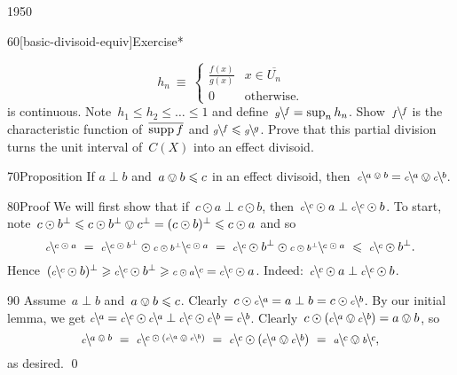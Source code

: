 \begin{parsec}{1950}
\begin{point}{60}[basic-divisoid-equiv]{Exercise*}
\begin{enumerate}
\begin{equation*}
    h_n \ \equiv \  \begin{cases}
        \frac{f(x)}{g(x)} & x \in \overline{U_n}\\
        0 & \text{otherwise}.
    \end{cases}
\end{equation*}
is continuous.
Note~$h_1 \leq h_2 \leq \ldots \leq 1$
    and define~$\rfrac{f}{g} = \sup_n h_n$.
Show~$\rfrac{f}{f}$ is the characteristic function
    of~$\overline{\supp f}$ and
    $\rfrac{f}{g} \leq \rfrac{g}{g}$.
Prove that this partial division turns the unit interval of~$C(X)$
    into an effect divisoid.
\end{enumerate}

\end{point}
\begin{point}{70}{Proposition}%
If $a \perp b$ and~$a \ovee b \leq c$ in an effect divisoid,
then~$\rfrac{a \ovee b}{c } = \rfrac{a}{c} \ovee \rfrac{b}{c}$.
\begin{point}{80}{Proof}%
We will first show that if~$c \odot a \perp c \odot b$,
    then~$\rfrac{c}{c} \odot a \perp \rfrac{c}{c}\odot b$.
To start,
    note~$c \odot b^\perp \leq c \odot b^\perp \ovee c^\perp
        = (c \odot b)^\perp \leq c \odot a$
        and so
\begin{equation*}
     \rfrac{c \odot a}{c} 
     \ = \ 
            \rfrac{c \odot b^\perp}{c} \odot
            \rfrac{c \odot a}{c \odot b^\perp}
     \ = \ 
            \rfrac{c}{c} \odot b^\perp \odot
            \rfrac{c \odot a}{c \odot b^\perp}
    \ \leq \ \rfrac{c}{c} \odot b^\perp.
\end{equation*}
Hence~$(\rfrac{c}{c}\odot b)^\perp
            \geq \rfrac{c}{c} \odot b^\perp
            \geq \rfrac{c}{c \odot a}
            = \rfrac{c}{c} \odot a $.
    Indeed:~$\rfrac{c}{c}\odot a \perp \rfrac{c}{c} \odot b$.
\begin{point}{90}%
Assume~$a\perp b$ and~$a\ovee b \leq c$. 
Clearly~$c \odot \rfrac{a}{c}  = a \perp b = c \odot \rfrac{b}{c}$.
By our initial lemma, we get
    $\rfrac{a}{c } =
    \rfrac{c}{c} \odot \rfrac{a}{c} \perp
    \rfrac{c}{c} \odot \rfrac{b}{c} =
    \rfrac{b}{c }
$.
Clearly~$c \odot (\rfrac{a}{c} \ovee \rfrac{b}{c}) = a \ovee b$, so
\begin{equation*}
    \rfrac{a \ovee b}{c} \ = \  
    \rfrac{c \odot (\rfrac{a}{c} \ovee \rfrac{b}{c})}{c} \ = \ 
\rfrac{c}{c} \odot (\rfrac{a}{c} \ovee \rfrac{b}{c}) \ = \ 
\rfrac{c}{a} \ovee \rfrac{c}{b},
\end{equation*}
as desired. \qed
\end{point}
\end{point}
\end{point}
\end{parsec}

